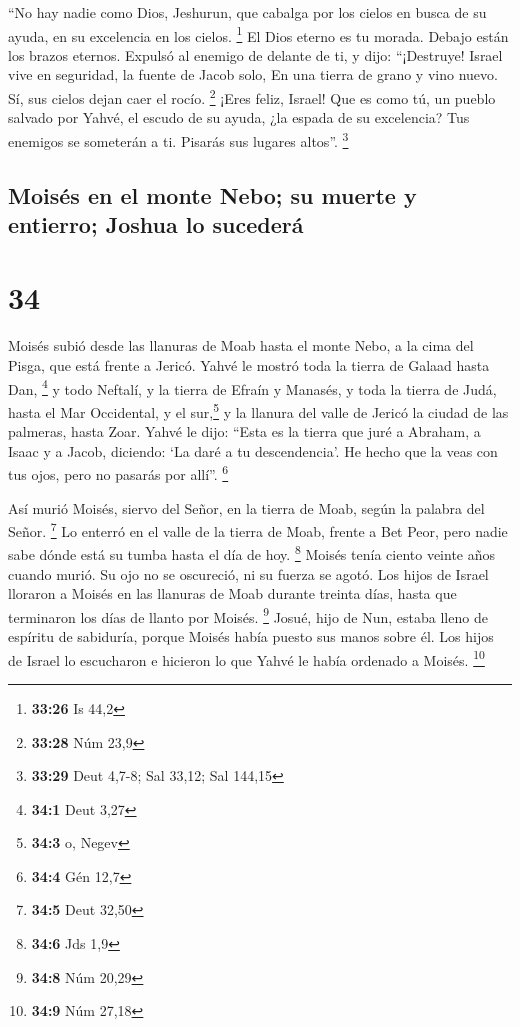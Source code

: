  ``No hay nadie como Dios, Jeshurun, que cabalga por los
cielos en busca de su ayuda, en su excelencia en los cielos. \footnote{\textbf{33:26}
  Is 44,2}  El Dios eterno es tu morada. Debajo están los
brazos eternos. Expulsó al enemigo de delante de ti, y dijo:
``¡Destruye!  Israel vive en seguridad, la fuente de
Jacob solo, En una tierra de grano y vino nuevo. Sí, sus cielos dejan
caer el rocío. \footnote{\textbf{33:28} Núm 23,9}  ¡Eres
feliz, Israel! Que es como tú, un pueblo salvado por Yahvé, el escudo de
su ayuda, ¿la espada de su excelencia? Tus enemigos se someterán a ti.
Pisarás sus lugares altos''. \footnote{\textbf{33:29} Deut 4,7-8; Sal
  33,12; Sal 144,15}

\hypertarget{moisuxe9s-en-el-monte-nebo-su-muerte-y-entierro-joshua-lo-sucederuxe1}{%
\subsection{Moisés en el monte Nebo; su muerte y entierro; Joshua lo
sucederá}\label{moisuxe9s-en-el-monte-nebo-su-muerte-y-entierro-joshua-lo-sucederuxe1}}

\hypertarget{section-33}{%
\section{34}\label{section-33}}

 Moisés subió desde las llanuras de Moab hasta el monte
Nebo, a la cima del Pisga, que está frente a Jericó. Yahvé le mostró
toda la tierra de Galaad hasta Dan, \footnote{\textbf{34:1} Deut 3,27}
 y todo Neftalí, y la tierra de Efraín y Manasés, y toda
la tierra de Judá, hasta el Mar Occidental,  y el
sur,\footnote{\textbf{34:3} o, Negev} y la llanura del valle de Jericó
la ciudad de las palmeras, hasta Zoar.  Yahvé le dijo:
``Esta es la tierra que juré a Abraham, a Isaac y a Jacob, diciendo: `La
daré a tu descendencia'. He hecho que la veas con tus ojos, pero no
pasarás por allí''. \footnote{\textbf{34:4} Gén 12,7}

 Así murió Moisés, siervo del Señor, en la tierra de Moab,
según la palabra del Señor. \footnote{\textbf{34:5} Deut 32,50}
 Lo enterró en el valle de la tierra de Moab, frente a Bet
Peor, pero nadie sabe dónde está su tumba hasta el día de hoy.
\footnote{\textbf{34:6} Jds 1,9}  Moisés tenía ciento
veinte años cuando murió. Su ojo no se oscureció, ni su fuerza se agotó.
 Los hijos de Israel lloraron a Moisés en las llanuras de
Moab durante treinta días, hasta que terminaron los días de llanto por
Moisés. \footnote{\textbf{34:8} Núm 20,29}  Josué, hijo de
Nun, estaba lleno de espíritu de sabiduría, porque Moisés había puesto
sus manos sobre él. Los hijos de Israel lo escucharon e hicieron lo que
Yahvé le había ordenado a Moisés. \footnote{\textbf{34:9} Núm 27,18}

